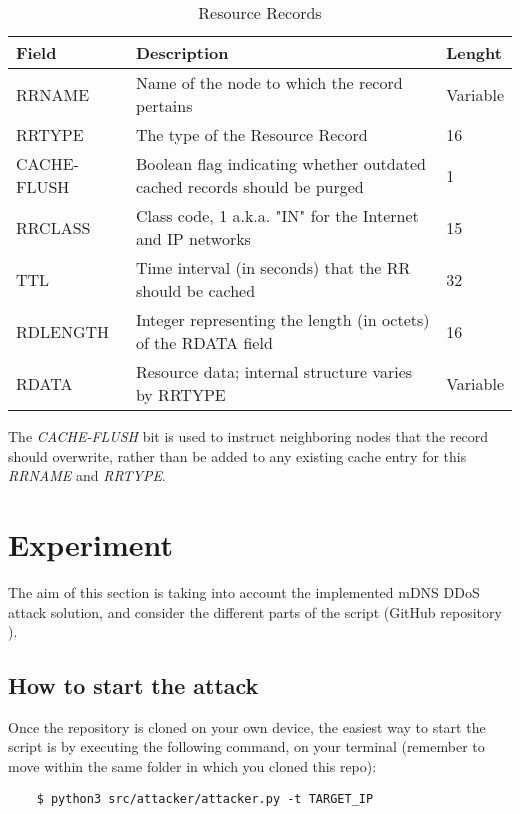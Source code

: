 \documentclass[fleqn, 10pt]{SelfArx} %
\begin{document}
\begin{table}[hbt]
	\centering
	\begin{tabular}{|C{1.7cm}|C{4.2cm}|C{1cm}|}
		\hline
		Field & Description & Lenght \\
		\hline
		\hline
		RRNAME & Name of the node to which the record pertains & Variable\\
		\hline
		RRTYPE & The type of the Resource Record & 16\\
		\hline
		CACHE-FLUSH & Boolean flag indicating whether outdated cached records should be purged & 1\\
		\hline
		RRCLASS & Class code, 1 a.k.a. "IN" for the Internet and IP networks & 15\\
		\hline
		TTL & Time interval (in seconds) that the RR should be cached & 32\\
		\hline
		RDLENGTH & Integer representing the length (in octets) of the RDATA field & 16\\
		\hline
		RDATA & Resource data; internal structure varies by RRTYPE & Variable\\
		\hline
	\end{tabular}
	\caption{Resource Records}
	\label{tab:table_2}
\end{table}

The {\it{CACHE-FLUSH}} bit is used to instruct neighboring nodes that the record should overwrite, rather than be added to any existing cache entry for this {\it{RRNAME}} and {\it{RRTYPE}}.


\section{Experiment}
The aim of this section is taking into account the implemented mDNS DDoS attack solution, and consider the different parts of the script
(GitHub repository \cite{repo}).

\subsection{How to start the attack}
Once the repository is cloned on your own device, the easiest way to start the script is by executing the following command, on your terminal (remember to move within the same folder
in which you cloned this repo):

\begin{footnotesize}
	\begin{verbatim}
	$ python3 src/attacker/attacker.py -t TARGET_IP 
	\end{verbatim}
\end{footnotesize}
\end{document}
